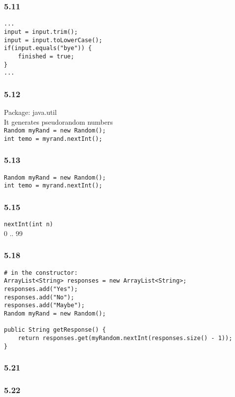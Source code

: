 \subsubsection{5.11}
\begin{lstlisting}
...
input = input.trim();
input = input.toLowerCase();
if(input.equals("bye")) {
    finished = true;
}
...
\end{lstlisting}

\subsubsection{5.12}
Package: java.util \\
It generates pseudorandom numbers \\
\verb!Random myRand = new Random();! \\
\verb!int temo = myrand.nextInt();!

\subsubsection{5.13}
\begin{lstlisting}
Random myRand = new Random();
int temo = myrand.nextInt();
\end{lstlisting}

\subsubsection{5.15}
\verb!nextInt(int n)! \\
0 .. 99

\subsubsection{5.18}
\begin{lstlisting}
# in the constructor: 
ArrayList<String> responses = new ArrayList<String>;
responses.add("Yes");
responses.add("No");
responses.add("Maybe");
Random myRand = new Random();

public String getResponse() {
    return responses.get(myRandom.nextInt(responses.size() - 1));
}
\end{lstlisting}

\subsubsection{5.21}

\subsubsection{5.22}

